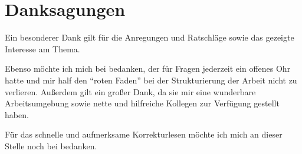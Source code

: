 \chapter*{Danksagungen}

Ein besonderer Dank gilt \thesisAdvisor{} für die Anregungen und Ratschläge sowie das gezeigte Interesse am Thema.

Ebenso möchte ich mich bei \thesisAdvisorSprd{} bedanken, der für Fragen jederzeit ein offenes Ohr hatte und mir half den \enquote{roten Faden} bei der Strukturierung der Arbeit nicht zu verlieren. Außerdem gilt \thesisCompany{} ein großer Dank, da sie mir eine wunderbare Arbeitsumgebung sowie nette und hilfreiche Kollegen zur Verfügung gestellt haben.

Für das schnelle und aufmerksame Korrekturlesen möchte ich mich an dieser Stelle noch bei \thesisProofreader{} bedanken. 
